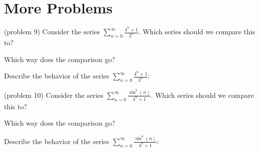 \documentclass{ximera}
\begin{document}
\begin{center}
\begin{foldable}
\end{foldable}
\end{center}


\section{More Problems}


\begin{problem}(problem 9)
Consider the series $\displaystyle{\sum_{n=0}^\infty \frac{4^n + 1}{2^n}}$.
Which series should we compare this to?

\begin{multipleChoice}
\end{multipleChoice}

Which way does the comparison go?
\begin{multipleChoice}
\end{multipleChoice}

Describe the behavior of the series $\sum_{n=0}^\infty \frac{4^n + 1}{2^n}:$
\begin{multipleChoice}
\end{multipleChoice}

\end{problem}




\begin{problem}(problem 10)
Consider the series $\displaystyle{\sum_{n=0}^\infty \frac{\sin^8(n)}{4^n + 1}}$.
Which series should we compare this to?

\begin{multipleChoice}
\end{multipleChoice}

Which way does the comparison go?
\begin{multipleChoice}
\end{multipleChoice}

Describe the behavior of the series $\sum_{n=0}^\infty \frac{\sin^8(n)}{4^n + 1}:$
\begin{multipleChoice}
\end{multipleChoice}

\end{problem}
\end{document}
